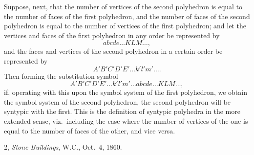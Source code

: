 \documentclass[11pt,a4paper]{book}
\begin{document}
Suppose, next, that the number of vertices of the second polyhedron is equal to the number of faces of the first polyhedron, and the number of faces of the second polyhedron is equal to the number of vertices of the first polyhedron; and let the vertices and faces of the first polyhedron in any order be represented by
\[
abcde\ldots KLM\ldots,
\]
and the faces and vertices of the second polyhedron in a certain order be represented by
\[
A'B'C'D'E'\ldots k'l'm'\ldots.
\]
Then forming the substitution symbol
\[
A'B'C'D'E'\ldots k'l'm'\ldots abcde\ldots KLM\ldots,
\]
if, operating with this upon the symbol system of the first polyhedron, we obtain the symbol system of the second polyhedron, the second polyhedron will be syntypic with the first. This is the definition of syntypic polyhedra in the more extended sense, viz.\ including the case where the number of vertices of the one is equal to the number of faces of the other, and vice versa.

\begin{flushright}
2, \textit{Stone Buildings}, W.C., Oct.~4, 1860.
\end{flushright}


\end{document}
